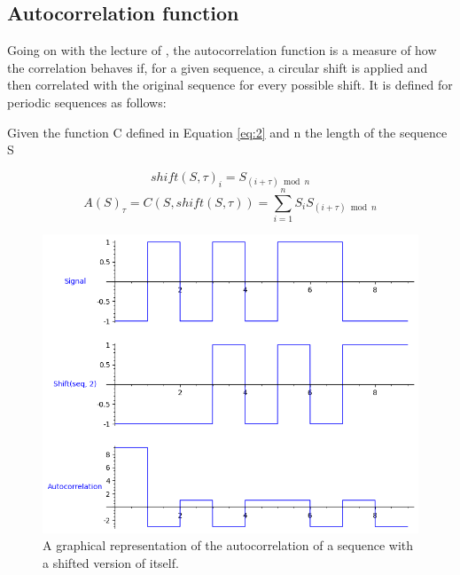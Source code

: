 \subsection{Autocorrelation function}

Going on with the lecture of \citet{golomb_ref}, the autocorrelation function
is a measure of how the correlation behaves if, for a given sequence, a
circular shift is applied and then correlated with the original sequence for every
possible shift. It is defined for periodic sequences as follows:

\begin{definition}[Autocorrelation]\label{def:3}

Given the function C defined in Equation \eqref{eq:2} and n the length of the
sequence S

\begin{equation}\label{eq:3}
  shift(S, \tau)_i = S_{(i+\tau) \bmod n}
\end{equation}
\begin{equation}\label{eq:4}
  A(S)_{\tau} = C(S, shift(S, \tau)) = \sum_{i=1}^{n}S_{i}S_{(i+\tau) \bmod n}
\end{equation}

\end{definition}

\begin{figure}[ht!] %
\begin{center}
\includegraphics[width=0.7\linewidth]{Chapters/Introduction/signals_autocorrelation}
\end{center}
\caption{A graphical representation of the autocorrelation of a sequence with  a shifted version of itself.}
\label{introduction_signals_autocorrelation}
\end{figure}

